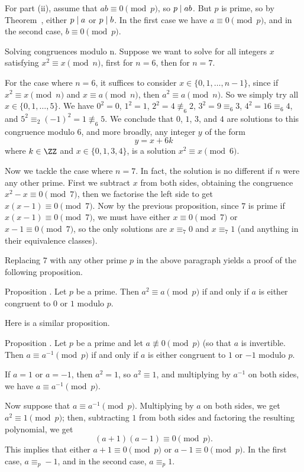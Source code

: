 For part (ii), assume that $ab\equiv 0\pmod p$, so $p\mid ab$. But $p$ is prime, so
by Theorem~{\thmpdivides}, either $p\mid a$ or $p\mid b$. In the first
case we have $a\equiv 0\pmod p$, and in the second case, $b\equiv 0\pmod p$.\slug

\medskip\boldlabel Solving congruences modulo {\mathbold n}.
Suppose we want to solve for all integers $x$ satisfying $x^2 \equiv x\pmod n$, first for $n=6$,
then for $n=7$.

For the case where $n=6$, it suffices to consider $x\in \{0,1,\ldots, n-1\}$,
since if $x^2\equiv x\pmod n$ and $x\equiv a\pmod n$, then $a^2\equiv a\pmod n$.
So we simply try all $x\in \{0,1,\ldots, 5\}$. We have $0^2 = 0$, $1^2 = 1$,
$2^2 = 4 \not\equiv_6 2$, $3^2 = 9\equiv_6 3$, $4^2 = 16\equiv_6 4$, and
$5^2 \equiv_2 (-1)^2 = 1\not\equiv_6 5$. We conclude that $0$, $1$, $3$, and $4$ are solutions
to this congruence modulo $6$, and more broadly, any integer $y$ of the form
$$y = x+6k$$
where $k\in \ZZ$ and $x\in \{0,1,3,4\}$, is a solution $x^2\equiv x\pmod 6$.

Now we tackle the case where $n=7$. In fact, the solution is no different
if $n$ were any other prime.
First we subtract $x$ from both sides, obtaining the congruence $x^2 - x\equiv 0\pmod 7$,
then we factorise the left side to get $x(x-1)\equiv 0\pmod 7$. Now by the previous proposition,
since $7$ is prime if $x(x-1)\equiv 0\pmod 7$, we must have either $x\equiv 0\pmod 7$ or
$x-1\equiv 0\pmod 7$, so the only solutions are $x\equiv_7 0$ and $x\equiv_7 1$ (and anything
in their equivalence classes).

Replacing $7$ with any other prime $p$ in the above paragraph yields a proof of the following
proposition.

\proclaim Proposition \advthm. Let $p$ be a prime. Then $a^2\equiv a\pmod p$ if and only if
$a$ is either congruent to $0$ or $1$ modulo $p$.\slug

Here is a similar proposition.

\edef\propselfinversemodp{\the\thmcount}
\proclaim Proposition \advthm. Let $p$ be a prime and let $a\not\equiv 0\pmod p$ (so
that $a$ is invertible. Then $a \equiv a^{-1}\pmod p$ if and only
if $a$ is either congruent to $1$ or $-1$ modulo $p$.

\proof If $a = 1$ or $a=-1$, then $a^2 = 1$, so $a^2\equiv 1$, and multiplying by $a^{-1}$ on both sides,
we have $a\equiv a^{-1}\pmod p$.

Now suppose that $a\equiv a^{-1}\pmod p$. Multiplying by $a$ on both sides, we get $a^2\equiv 1\pmod p$;
then, subtracting $1$ from both sides and factoring the resulting polynomial, we get
$$(a+1)(a-1)\equiv 0\pmod p.$$
This implies that either $a+1\equiv 0\pmod p$ or $a-1\equiv 0\pmod p$. In the first case, $a \equiv_p -1$,
and in the second case, $a\equiv_p 1$.\slug

